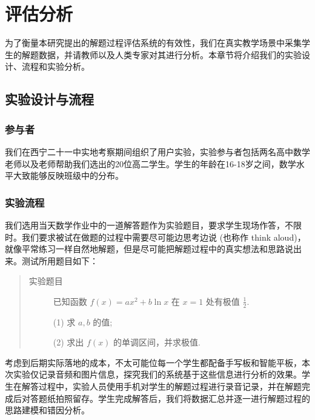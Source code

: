 
\chapter{评估分析}

为了衡量本研究提出的解题过程评估系统的有效性，我们在真实教学场景中采集学生的解题数据，并请教师以及人类专家对其进行分析。本章节将介绍我们的实验设计、流程和实验分析。

\section{实验设计与流程}

\subsection{参与者}

我们在西宁二十一中实地考察期间组织了用户实验，实验参与者包括两名高中数学老师以及老师帮助我们选出的20位高二学生。学生的年龄在16-18岁之间，数学水平大致能够反映班级中的分布。

\subsection{实验流程}

我们选用当天数学作业中的一道解答题作为实验题目，要求学生现场作答，不限时。我们要求被试在做题的过程中需要尽可能边思考边说 (也称作 think aloud)，就像平常练习一样自然地解题，但是尽可能把解题过程中的真实想法和思路说出来。测试所用题目如下：

\begin{quote}
    \begin{description}
        \item[实验题目] 已知函数 $f(x) = ax^2 + b \ln x$ 在 $x=1$ 处有极值 $\frac{1}{2}$.

        (1) 求 $a, b$ 的值;

        (2) 求出 $f(x)$ 的单调区间，并求极值.

    \end{description}
\end{quote}

考虑到后期实际落地的成本，不太可能位每一个学生都配备手写板和智能平板，本次实验仅记录音频和图片信息，探究我们的系统基于这些信息进行分析的效果。学生在解答过程中，实验人员使用手机对学生的解题过程进行录音记录，并在解题完成后对答题纸拍照留存。学生完成解答后，我们将数据汇总并逐一进行解题过程的思路建模和错因分析。

